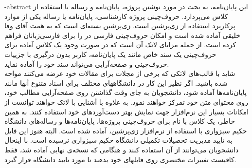 \fa-abstract{
این پایان‌نامه، به بحث در مورد نوشتن پروژه، پایان‌نامه و رساله با استفاده از کلاس 
می‌پردازد.
حروف‌چینی پروژه کارشناسی، پایان‌نامه یا رساله یکی از موارد پرکاربرد استفاده از زی‌پرشین است. 
زی‌پرشین بسته‌ای است که به همت آقای وفا خلیقی آماده شده است و امکان حروف‌چینی فارسی در \lr{\LaTeXe}{} را  برای فارسی‌زبانان فراهم کرده است.
از جمله مزایای لاتک آن است که در صورت وجود یک کلاس آماده برای حروف‌چینی یک سند خاص مانند یک پایان‌نامه، کاربر بدون درگیری با جزییات حروف‌چینی و صفحه‌آرایی می‌تواند سند خود را آماده نماید.
\\
شاید با قالب‌های لاتکی که برخی از مجلات برای مقالات خود عرضه می‌کنند مواجه شده باشید. اگر نظیر این کار در دانشگاههای مختلف برای اسناد متنوع آنها مانند پایا‌ن‌نامه‌ها آماده شود، دانشجویان به جای وقت گذاشتن روی صفحه‌آرایی مطالب خود، روی محتوای متن خود تمرکز خواهند نمود. به علاوه با آشنایی با لاتک خواهند توانست از امکانات بسیار این نرم‌افزار جهت نمایش بهتر دست‌آوردهای خود استفاده کنند.
به همین خاطر، یک کلاس با نام 
 برای حروف‌چینی پروژه‌ها، پایان‌نامه‌ها و رساله‌های دانشگاه حکیم سبزواری با استفاده از نرم‌افزار زی‌پرشین،  آماده شده است. البته هنوز این فایل به تایید مدیریت تحصیلات تکمیلی دانشگاه حکیم سبزواری نرسیده است. با اینحال دانشجویان می‌توانند از آن استفاده کنند و هنگامی که نسخه‌ی نهایی آماده شد، فقط کافیست تغییرات مختصری روی فایلهای خود بدهند تا مورد تایید دانشگاه قرار گیرد.
}


\abstractPage

\newpage\clearpage